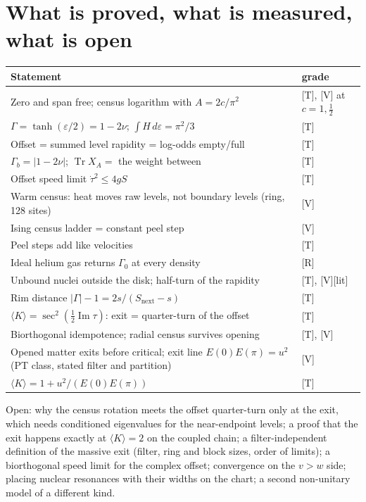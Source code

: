 \documentclass[11pt]{article}
\theoremstyle{definition}
\newcommand{\grade}[1]{\textsf{\small[#1]}}
\newcommand{\Tr}{\operatorname{Tr}}
\begin{document}
\section{What is proved, what is measured, what is open}
\begin{center}\small
\begin{tabular}{p{}l}\toprule
Statement & grade\\\midrule
Zero and span free; census logarithm with $A=2c/\pi^2$ & \grade{T}, \grade{V} at $c=1,\tfrac12$\\
$\Gamma=\tanh(\varepsilon/2)=1-2\nu$; $\int H\,d\varepsilon=\pi^2/3$ & \grade{T}\\
Offset = summed level rapidity = log-odds empty/full & \grade{T}\\
$\Gamma_b=|1-2\nu|$; $\Tr X_A=$ the weight between & \grade{T}\\
Offset speed limit $\dot\tau^2\le4gS$ & \grade{T}\\
Warm census: heat moves raw levels, not boundary levels (ring, 128 sites) & \grade{V}\\
Ising census ladder = constant peel step & \grade{V}\\
Peel steps add like velocities & \grade{T}\\
Ideal helium gas returns $\Gamma_0$ at every density & \grade{R}\\
Unbound nuclei outside the disk; half-turn of the rapidity & \grade{T}, \grade{V}\grade{lit}\\
Rim distance $|\Gamma|-1=2s/(S_{\mathrm{next}}-s)$ & \grade{T}\\
$\langle K\rangle=\sec^2(\tfrac12\operatorname{Im}\tau)$: exit = quarter-turn of the offset & \grade{T}\\
Biorthogonal idempotence; radial census survives opening & \grade{T}, \grade{V}\\
Opened matter exits before critical; exit line $E(0)E(\pi)=u^2$ (PT class, stated filter and partition) & \grade{V}\\
$\langle K\rangle=1+u^2/(E(0)E(\pi))$ & \grade{T}\\\bottomrule
\end{tabular}
\end{center}
\noindent Open: why the census rotation meets the offset quarter-turn only at the exit, which needs conditioned eigenvalues for the near-endpoint levels; a proof that the exit happens exactly at $\langle K\rangle=2$ on the coupled chain; a filter-independent definition of the massive exit (filter, ring and block sizes, order of limits); a biorthogonal speed limit for the complex offset; convergence on the $v>w$ side; placing nuclear resonances with their widths on the chart; a second non-unitary model of a different kind.
\end{document}
